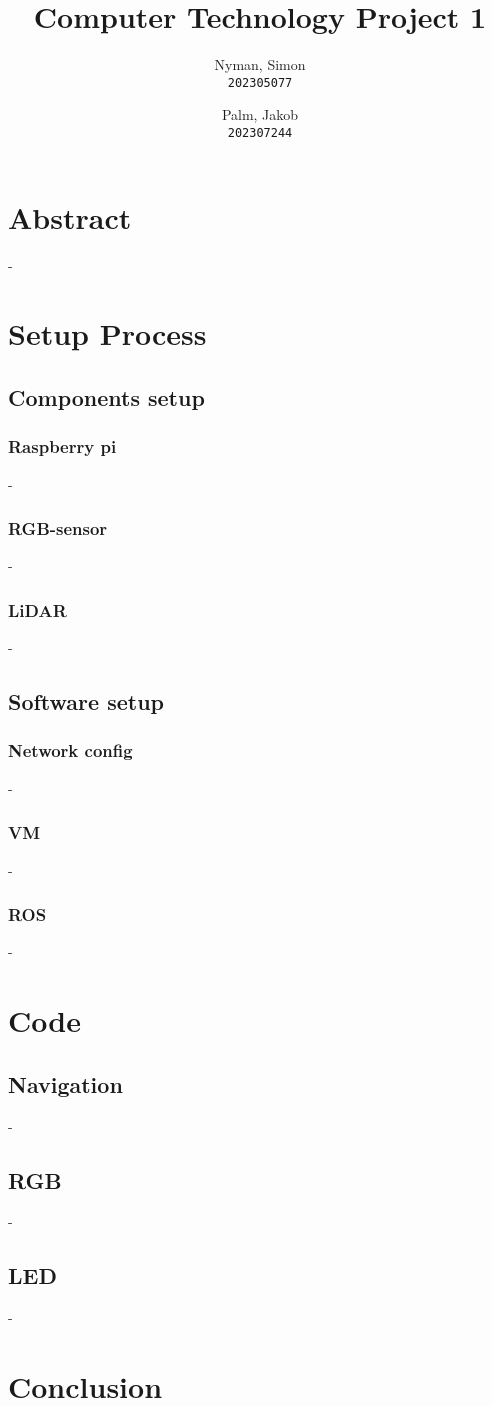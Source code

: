 \documentclass{article}
\author{
    Nyman, Simon\\
    \texttt{202305077}
    \and
    Palm, Jakob\\
    \texttt{202307244}
}
\begin{document}
\pagestyle{plain}
\title{Computer Technology Project 1}
\maketitle

    \section*{Abstract}
        -
    \section*{Setup Process}
        \subsection*{Components setup}
            \subsubsection*{Raspberry pi}
                -
        \subsubsection*{RGB-sensor}
                -
        \subsubsection*{LiDAR}
                -
        \subsection*{Software setup}
            \subsubsection*{Network config}
                -
            \subsubsection*{VM}
                -
            \subsubsection*{ROS}
                -

    \section*{Code}
        \subsection*{Navigation}
            -
        \subsection*{RGB}
            -
        \subsection*{LED}
            -

    \section*{Conclusion}
\end{document}
